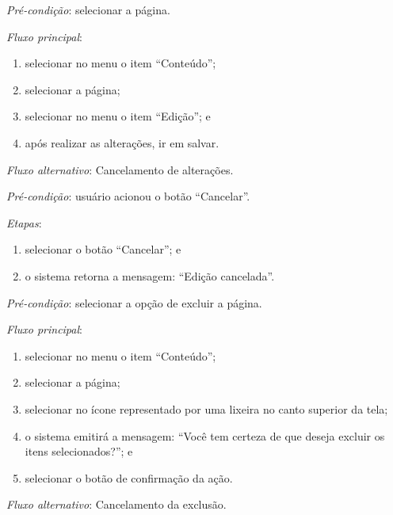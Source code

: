 \documentclass[a4paper,12pt]{article}
\begin{document}
\vspace{0.7cm}

\noindent \textit{Pré-condição}: selecionar a página.

\noindent \textit{Fluxo principal}:

\begin{enumerate}
    \item selecionar no menu o item ``Conteúdo'';
    \item selecionar a página;
    \item selecionar no menu o item ``Edição''; e
    \item após realizar as alterações, ir em salvar.
\end{enumerate}

\noindent \textit{Fluxo alternativo}: Cancelamento de alterações.

\noindent \textit{Pré-condição}: usuário acionou o botão ``Cancelar''.

\noindent \textit{Etapas}:

\begin{enumerate}
    \item selecionar o botão ``Cancelar''; e
    \item o sistema retorna a mensagem: ``Edição cancelada''.
\end{enumerate}


\vspace{0.7cm}

\noindent \textit{Pré-condição}: selecionar a opção de excluir a página.

\noindent \textit{Fluxo principal}:

\begin{enumerate}
    \item selecionar no menu o item ``Conteúdo'';
    \item selecionar a página;
    \item selecionar no ícone representado por uma lixeira no canto superior da tela;
    \item o sistema emitirá a mensagem: ``Você tem certeza de que deseja excluir os itens selecionados?''; e
    \item selecionar o botão de confirmação da ação.
\end{enumerate}

\noindent \textit{Fluxo alternativo}: Cancelamento da exclusão.
\end{document}
